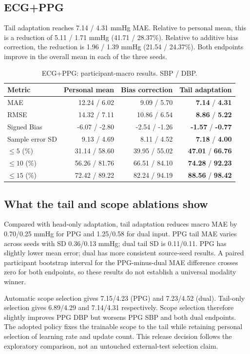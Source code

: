 \documentclass[conference]{IEEEtran}
\begin{document}
\subsection{ECG+PPG}
Tail adaptation reaches 7.14 / 4.31 mmHg MAE. Relative to personal mean, this is a reduction of 5.11 / 1.71 mmHg (41.71 / 28.37\%). Relative to additive bias correction, the reduction is 1.96 / 1.39 mmHg (21.54 / 24.37\%). Both endpoints improve in the overall mean in each of the three seeds.
\begin{table}[ht]\centering\caption{ECG+PPG: participant-macro results. SBP / DBP.}\scriptsize\setlength{\tabcolsep}{3pt}
\begin{tabular}{lrrr}\toprule
Metric & Personal mean & Bias correction & Tail adaptation\\\midrule
MAE & 12.24 / 6.02 & 9.09 / 5.70 & \textbf{7.14} / \textbf{4.31}\\
RMSE & 14.32 / 7.11 & 10.86 / 6.54 & \textbf{8.86} / \textbf{5.22}\\
Signed Bias & -6.07 / -2.80 & -2.54 / -1.26 & \textbf{-1.57} / \textbf{-0.77}\\
Sample error SD & 9.13 / 4.69 & 8.11 / 4.52 & \textbf{7.18} / \textbf{4.00}\\
$\leq5$ (\%) & 31.14 / 58.60 & 39.95 / 55.02 & \textbf{47.01} / \textbf{66.76}\\
$\leq10$ (\%) & 56.26 / 81.76 & 66.51 / 84.10 & \textbf{74.28} / \textbf{92.23}\\
$\leq15$ (\%) & 72.42 / 89.22 & 82.24 / 94.19 & \textbf{88.56} / \textbf{98.42}\\
\bottomrule\end{tabular}\end{table}

\subsection{What the tail and scope ablations show}
Compared with head-only adaptation, tail adaptation reduces macro MAE by
0.70/0.25 mmHg for PPG and 1.25/0.58 for dual input. PPG tail MAE varies across
seeds with SD 0.36/0.13 mmHg; dual tail SD is 0.11/0.11. PPG has slightly lower
mean error; dual has more consistent source-seed results. A paired participant
bootstrap interval for the PPG-minus-dual MAE difference crosses zero for both
endpoints, so these results do not establish a universal modality winner.

Automatic scope selection gives 7.15/4.23 (PPG) and 7.23/4.52 (dual). Tail-only
selection gives 6.89/4.29 and 7.14/4.31 respectively. Scope selection therefore
slightly improves PPG DBP but worsens PPG SBP and both dual endpoints. The
adopted policy fixes the trainable scope to the tail while retaining personal
selection of learning rate and update count. This release decision follows
the exploratory comparison, not an untouched external-test selection claim.
\end{document}
